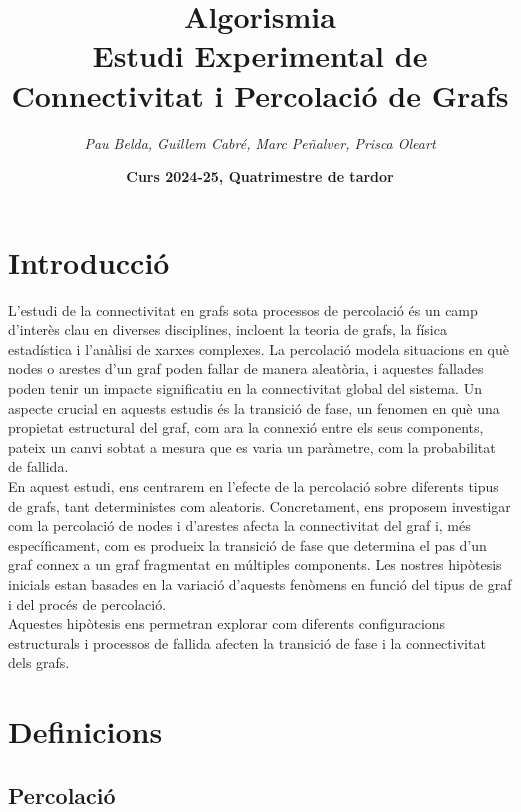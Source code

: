 \documentclass[a4paper]{article}
\title{\textbf{\huge Algorismia}\\[0.5cm]
	\textbf{\Large Estudi Experimental de Connectivitat i Percolació de Grafs}}
\author{\emph{Pau Belda, Guillem Cabré, Marc Peñalver, Prisca Oleart}}
\date{\textbf{Curs 2024-25, Quatrimestre de tardor}}
\begin{document}
	
	\begin{titlepage}
		\clearpage\maketitle
		\thispagestyle{empty}
	\end{titlepage}
	
	\tableofcontents
	\clearpage

	\section{Introducció}

	L'estudi de la connectivitat en grafs sota processos de percolació és un camp d'interès clau en diverses disciplines, incloent la teoria de grafs, la física estadística i l'anàlisi de xarxes complexes. La percolació modela situacions en què nodes o arestes d'un graf poden fallar de manera aleatòria, i aquestes fallades poden tenir un impacte significatiu en la connectivitat global del sistema. Un aspecte crucial en aquests estudis és la transició de fase, un fenomen en què una propietat estructural del graf, com ara la connexió entre els seus components, pateix un canvi sobtat a mesura que es varia un paràmetre, com la probabilitat de fallida. \\
	
	En aquest estudi, ens centrarem en l'efecte de la percolació sobre diferents tipus de grafs, tant deterministes com aleatoris. Concretament, ens proposem investigar com la percolació de nodes i d'arestes afecta la connectivitat del graf i, més específicament, com es produeix la transició de fase que determina el pas d'un graf connex a un graf fragmentat en múltiples components. Les nostres hipòtesis inicials estan basades en la variació d'aquests fenòmens en funció del tipus de graf i del procés de percolació. \\
	
	Aquestes hipòtesis ens permetran explorar com diferents configuracions estructurals i processos de fallida afecten la transició de fase i la connectivitat dels grafs.\\
	
	\newpage
	
	\section{Definicions}
		
	\subsection{Percolació}
	
\end{document}
